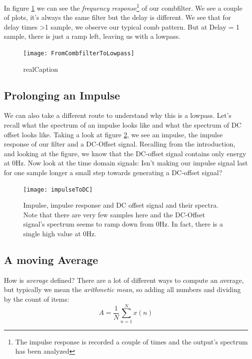 In figure \ref{fig:combToLowpass} we can see the \textit{frequency response}\footnote{The impulse response is recorded a couple of times and the output's spectrum has been analyzed} of our combfilter. We see a couple of plots, it's always the same filter but the delay is different. We see that for delay times >1 sample, we observe our typical comb pattern. But at Delay = 1 sample, there is just a ramp left, leaving us with a lowpass.

\begin{figure}[H]
	\centering
	\texttt{[image: FromCombfilterToLowpass]}
	\caption[shortCaption]
	{realCaption}
	\label{fig:combToLowpass}
\end{figure}



\subsection{Prolonging an Impulse}
We can also take a different route to understand why this is a lowpass. Let's recall what the spectrum of an impulse looks like and what the spectrum of DC offset looks like. Taking a look at figure \ref{fig:impToDc}, we see an impulse, the impulse response of our filter and a DC-Offset signal. Recalling from the introduction, and looking at the figure, we know that the DC-offset signal contains only energy at 0Hz. Now look at the time domain signals: Isn't making our impulse signal last for one sample longer a small step towards generating a DC-offset signal?

\begin{figure}[H]
	\centering
	\texttt{[image: impulseToDC]}
	\caption[Spectrum Impulse, Lowpass, DC]
	{Impulse, impulse response and DC offset signal and their spectra. Note that there are very few samples here and the DC-Offset signal's spectrum seems to ramp down from 0Hz. In fact, there is a single high value at 0Hz.}
	\label{fig:impToDc}
\end{figure}

\subsection{A moving Average}
How is \textit{average} defined? There are a lot of different ways to compute an average, but typically we mean the \textit{arithmetic mean}, so adding all numbers and dividing by the count of items:
\begin{equation}
	A = \frac{1}{N} \sum_{n=1}^N x(n)
\end{equation}

